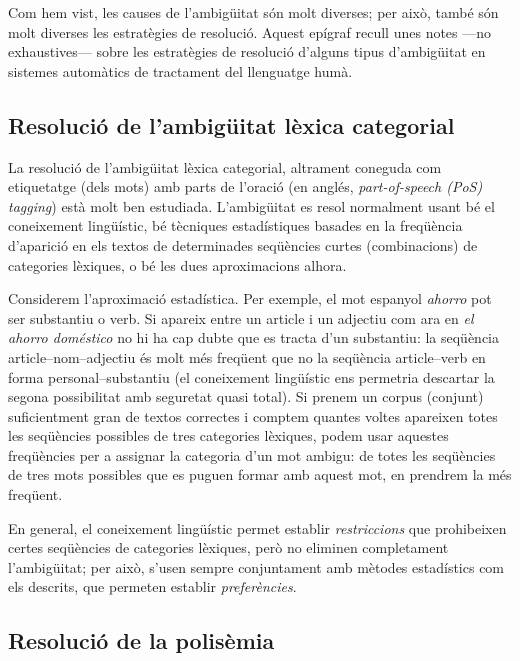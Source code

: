 Com hem vist, les causes de l'ambigüitat són molt diverses; per això,
també són molt diverses les estratègies de resolució. Aquest epígraf
recull unes notes ---no exhaustives--- sobre les estratègies de
resolució d'alguns tipus d'ambigüitat en sistemes automàtics de
tractament del llenguatge humà.

\subsection{Resolució de l'ambigüitat lèxica categorial} 
\label{s3:reshom}

La resolució de l'ambigüitat lèxica categorial, altrament coneguda com
etiquetatge (dels mots) amb parts de l'oració (en anglés,
\emph{part-of-speech (PoS) tagging}) està molt ben estudiada.
L'ambigüitat es resol normalment usant bé el coneixement lingüístic,
bé tècniques estadístiques basades en la freqüència d'aparició en els
textos de determinades seqüències curtes (combinacions) de categories
lèxiques, o bé les dues aproximacions alhora.


Considerem l'aproximació estadística. Per exemple, el mot espanyol
\emph{ahorro} pot ser substantiu o verb. Si apareix entre un article i
un adjectiu com ara en \emph{el ahorro doméstico} no hi ha cap dubte
que es tracta d'un substantiu: la seqüència article--nom--adjectiu és
molt més freqüent que no la seqüència article--verb en forma
personal--substantiu (el coneixement lingüístic ens permetria
descartar la segona possibilitat amb seguretat quasi total). Si prenem
un corpus (conjunt) suficientment gran de textos correctes i comptem
quantes voltes apareixen totes les seqüències possibles de tres
categories lèxiques, podem usar aquestes freqüències per a assignar la
categoria d'un mot ambigu: de totes les seqüències de tres mots
possibles que es puguen formar amb aquest mot, en prendrem la més
freqüent. 

En general, el coneixement lingüístic permet establir
\emph{restriccions} que prohibeixen certes seqüències de categories
lèxiques, però no eliminen completament l'ambigüitat; per això, s'usen
sempre conjuntament amb mètodes estadístics com els descrits, que
permeten establir \emph{preferències}.

\subsection{Resolució de la polisèmia}

